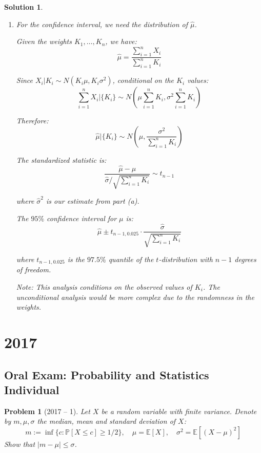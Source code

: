 \documentclass[12pt]{amsart}
\newtheorem{problem}{Problem}
\newtheorem*{solution}{Solution}
\begin{document}
\begin{solution}
\begin{enumerate}[label=(\alph*)]
\item For the confidence interval, we need the distribution of $\hat{\mu}$.

Given the weights $K_1, \ldots, K_n$, we have:
$$\hat{\mu} = \frac{\sum_{i=1}^n X_i}{\sum_{i=1}^n K_i}$$

Since $X_i | K_i \sim N(K_i \mu, K_i \sigma^2)$, conditional on the $K_i$ values:
$$\sum_{i=1}^n X_i | \{K_i\} \sim N\left(\mu \sum_{i=1}^n K_i, \sigma^2 \sum_{i=1}^n K_i\right)$$

Therefore:
$$\hat{\mu} | \{K_i\} \sim N\left(\mu, \frac{\sigma^2}{\sum_{i=1}^n K_i}\right)$$

The standardized statistic is:
$$\frac{\hat{\mu} - \mu}{\hat{\sigma}/\sqrt{\sum_{i=1}^n K_i}} \sim t_{n-1}$$

where $\hat{\sigma}^2$ is our estimate from part (a).

The $95\%$ confidence interval for $\mu$ is:
$$\hat{\mu} \pm t_{n-1,0.025} \cdot \frac{\hat{\sigma}}{\sqrt{\sum_{i=1}^n K_i}}$$

where $t_{n-1,0.025}$ is the $97.5\%$ quantile of the $t$-distribution with $n-1$ degrees of freedom.

Note: This analysis conditions on the observed values of $K_i$. The unconditional analysis would be more complex due to the randomness in the weights.
\end{enumerate}
\end{solution}

\section*{2017}
\subsection*{Oral Exam: Probability and Statistics Individual}
\begin{problem}[2017 -- 1]
Let $X$ be a random variable with finite variance. Denote by $m, \mu, \sigma$ the median, mean and standard deviation of $X$:
$$
m:=\inf \{c: \mathbb{P}[X \leq c] \geq 1 / 2\}, \quad \mu=\mathbb{E}[X], \quad \sigma^2=\mathbb{E}[(X-\mu)^2]
$$
Show that $|m-\mu| \leq \sigma$.
\end{problem}
\end{document}
